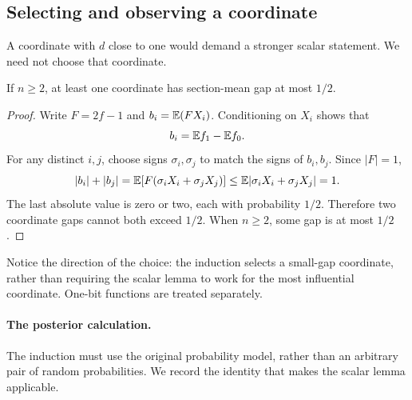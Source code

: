 \subsection{Selecting and observing a coordinate}
A coordinate with $d$ close to one would demand a stronger scalar statement. We need not choose that coordinate.

\begin{lemma}\label{lem:smallcoordinate}
If $n\ge2$, at least one coordinate has section-mean gap at most $1/2$.
\end{lemma}
\begin{proof}
Write $F=2f-1$ and $b_i=\mathbb E(FX_i)$. Conditioning on $X_i$ shows that
\[
b_i=\mathbb E f_1-\mathbb E f_0.
\]
For any distinct $i,j$, choose signs $\sigma_i,\sigma_j$ to match the signs of $b_i,b_j$. Since $|F|=1$,
\[
|b_i|+|b_j|
=\mathbb E[F(\sigma_iX_i+\sigma_jX_j)]
\le\mathbb E|\sigma_iX_i+\sigma_jX_j|=1.
\]
The last absolute value is zero or two, each with probability $1/2$. Therefore two coordinate gaps cannot both exceed $1/2$. When $n\ge2$, some gap is at most $1/2$.
\end{proof}
Notice the direction of the choice: the induction selects a small-gap coordinate, rather than requiring the scalar lemma to work for the most influential coordinate. One-bit functions are treated separately.

\paragraph{The posterior calculation.}
The induction must use the original probability model, rather than an arbitrary pair of random probabilities. We record the identity that makes the scalar lemma applicable.


